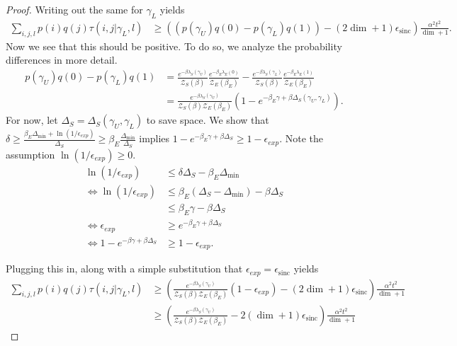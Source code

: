 \documentclass{article}
\newcommand{\parens}[1]{\left( #1 \right)}
\newcommand{\partfun}{\mathcal{Z}}
\DeclareMathOperator{\sinc}{sinc}
\begin{document}
\begin{proof}
     Writing out the same for $\gamma_L$ yields
     \begin{align}
        \sum_{i,j,l} p(i) q(j) \tau(i,j | \gamma_L, l) &\geq \parens{(p(\gamma_U) q(0) - p(\gamma_L) q(1))  - (2 \dim + 1) \epsilon_{\sinc}} \frac{\alpha^2 t^2}{\dim + 1}.
     \end{align}
     Now we see that this should be positive. To do so, we analyze the probability differences in more detail.
     \begin{align}
        p(\gamma_U) q(0) - p(\gamma_L) q(1) &= \frac{e^{-\beta \lambda_S(\gamma_U)}}{\partfun_S(\beta)} \frac{e^{-\beta_E \lambda_E(0)}}{\partfun_E(\beta_E)} - \frac{e^{-\beta \lambda_S(\gamma_L)}}{\partfun_S(\beta)} \frac{e^{-\beta_E \lambda_E(1)}}{\partfun_E(\beta_E)} \\
        &= \frac{e^{-\beta \lambda_S(\gamma_U)}}{\partfun_S(\beta) \partfun_E(\beta_E)} \parens{1 - e^{-\beta_E \gamma + \beta \Delta_S(\gamma_U, \gamma_L)}}.
     \end{align}
     For now, let $\Delta_S = \Delta_S(\gamma_U, \gamma_L)$ to save space. We show that $\delta \geq \frac{\beta_E \Delta_{\min} + \ln (1 / \epsilon_{exp})}{\Delta_S} \geq \beta_E \frac{\Delta_{\min}}{\Delta_S}$ implies $1 - e^{-\beta_E \gamma + \beta \Delta_S} \geq 1 - \epsilon_{exp}$. Note the assumption $\ln (1/ \epsilon_{exp}) \geq 0$. 
     \begin{align}
        \ln (1 / \epsilon_{exp}) &\leq \delta \Delta_S - \beta_E \Delta_{\min} \\
        \iff \ln (1 / \epsilon_{exp}) &\leq \beta_E (\Delta_S - \Delta_{\min}) - \beta \Delta_S \\
        &\leq \beta_E \gamma - \beta \Delta_S \\
        \iff \epsilon_{exp} &\geq e^{-\beta_E \gamma + \beta \Delta_S} \\
        \iff 1 - e^{-\beta \gamma + \beta \Delta_S}  &\geq 1 - \epsilon_{exp}.
     \end{align}

     Plugging this in, along with a simple substitution that $\epsilon_{exp} = \epsilon_{\sinc}$ yields 
     \begin{align}
        \sum_{i,j,l} p(i) q(j) \tau(i,j | \gamma_L, l) &\geq \parens{\frac{e^{-\beta \lambda_S(\gamma_U)}}{\partfun_S(\beta) \partfun_E(\beta_E)} (1 - \epsilon_{exp}) - (2 \dim + 1) \epsilon_{\sinc}} \frac{\alpha^2 t^2}{\dim + 1} \\
        &\geq \parens{\frac{e^{-\beta \lambda_S(\gamma_U)}}{\partfun_S(\beta) \partfun_E(\beta_E)} - 2 (\dim + 1) \epsilon_{\sinc}} \frac{\alpha^2 t^2}{\dim + 1}
     \end{align}
\end{proof}
\end{document}
